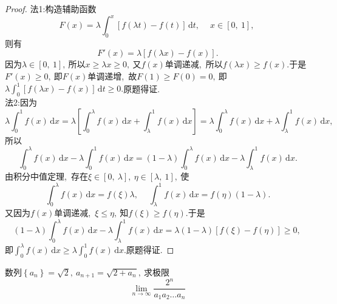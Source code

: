 	\begin{proof}
		法1:构造辅助函数
		$$F(x)=\lambda\int_{0}^{x}\left[f(\lambda t)-f(t)\right]\,\text{d}t,\ \quad x \in \left[0,\ 1\right],\ $$
		则有
		$$F'(x)=\lambda\left[f(\lambda x)-f(x)\right].$$
		因为$\lambda\in\left[0,\ 1\right],\ $所以$x\ge \lambda x\ge 0,\ $又$f(x)$单调递减,\ 所以$f(\lambda x)\ge f(x).$于是$F'(x)\ge 0,\ $即$F(x)$单调递增,\ 故$F(1)\ge F(0)=0,\ $即$\lambda\int_{0}^{1}\left[f(\lambda x)-f(x)\right]\,\text{d}t\ge 0.$原题得证.
		~\\
		
		法2:因为
		$$\lambda\int_{0}^{1}f(x)\,\text{d}x=\lambda\left[\int_{0}^{\lambda}f(x)\,\text{d}x+\int_{\lambda}^{1}f(x)\,\text{d}x\right]=\lambda\int_{0}^{\lambda}f(x)\,\text{d}x+\lambda\int_{\lambda}^{1}f(x)\,\text{d}x,\ $$
		所以
		$$\int_{0}^{\lambda}f(x)\,\text{d}x-\lambda\int_{0}^{1}f(x)\,\text{d}x=(1-\lambda)\int_{0}^{\lambda}f(x)\,\text{d}x-\lambda\int_{\lambda}^{1}f(x)\,\text{d}x.$$
		由积分中值定理,\ 存在$\xi\in\left[0,\ \lambda\right],\ \eta\in\left[\lambda,\ 1\right],\ $使
		$$\int_{0}^{\lambda}f(x)\,\text{d}x=f(\xi)\lambda,\ \quad\int_{\lambda}^{1}f(x)\,\text{d}x=f(\eta)(1-\lambda).$$
		又因为$f(x)$单调递减,\ $\xi\le\eta,\ $知$f(\xi)\ge f(\eta).$于是
		$$(1-\lambda)\int_{0}^{\lambda}f(x)\,\text{d}x-\lambda\int_{\lambda}^{1}f(x)\,\text{d}x=\lambda(1-\lambda)\left[f(\xi)-f(\eta)\right]\ge 0,\ $$
		即$\int_{0}^{\lambda}f(x)\,\text{d}x\ge\lambda\int_{0}^{1}f(x)\,\text{d}x.$原题得证.
	\end{proof}
	\newpage
	\begin{problem}数列$\left\{a_n\right\} = \sqrt{2},\ a_{n+1}=\sqrt{2+a_n},\ $求极限$$\lim\limits_{n\rightarrow \infty}\frac{2^n}{a_1a_2\dots a_n}$$
	\end{problem}
	
